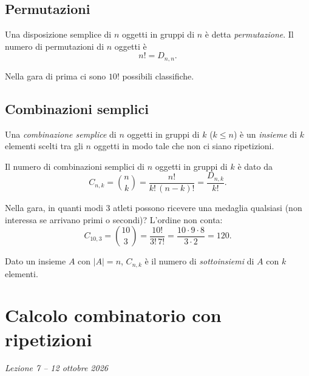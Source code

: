 \documentclass[11pt,a4paper]{article}
\begin{document}
\subsection{Permutazioni}

\begin{osservazione}
Una disposizione semplice di $n$ oggetti in gruppi di $n$ è detta \emph{permutazione}. Il numero di permutazioni di $n$ oggetti è
\[
n! = D_{n,n}.
\]
\end{osservazione}

\begin{esempio}
Nella gara di prima ci sono $10!$ possibili classifiche.
\end{esempio}

\subsection{Combinazioni semplici}

\begin{definizione}
Una \emph{combinazione semplice} di $n$ oggetti in gruppi di $k$ ($k \leq n$) è un \emph{insieme} di $k$ elementi scelti tra gli $n$ oggetti in modo tale che non ci siano ripetizioni.
\end{definizione}

\begin{proposizione}
Il numero di combinazioni semplici di $n$ oggetti in gruppi di $k$ è dato da
\[
C_{n,k} = \binom{n}{k} = \frac{n!}{k!\,(n-k)!} = \frac{D_{n,k}}{k!} .
\]
\end{proposizione}

\begin{esempio}
Nella gara, in quanti modi $3$ atleti possono ricevere una medaglia qualsiasi (non interessa se arrivano primi o secondi)? L'ordine non conta:
\[
C_{10,3} = \binom{10}{3} = \frac{10!}{3!\,7!} = \frac{10 \cdot 9 \cdot 8}{3 \cdot 2} = 120 .
\]
\end{esempio}

\begin{osservazione}
Dato un insieme $A$ con $|A| = n$, $C_{n,k}$ è il numero di \emph{sottoinsiemi} di $A$ con $k$ elementi.
\end{osservazione}

\section[Calcolo combinatorio con ripetizioni (Lezione 7 -- 12 ottobre 2026)]{Calcolo combinatorio con ripetizioni}
\noindent\emph{Lezione 7 -- 12 ottobre 2026}
\end{document}
